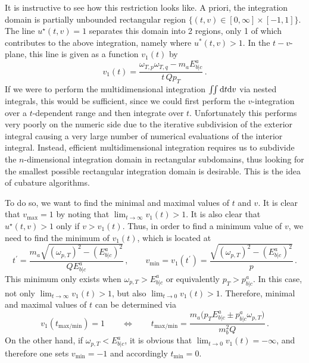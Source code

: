 It is instructive to see how this restriction looks like. A priori, the integration domain is partially unbounded rectangular region ${\{(t,v)\in[0,\infty]\times[-1,1]\}}$. The line ${u^\star(t,v)=1}$ separates this domain into 2 regions, only 1 of which contributes to the above integration, namely where ${u^*(t,v)>1}$. In the $t-v$-plane, this line is given as a function ${v_1(t)}$ by
\begin{equation}
    v_1(t)=\frac{\omega_{T,p}\omega_{T,q}-m_aE^a_{b\vert c}}{t\,Qp_T}\,.
    \label{eq:DecayCalc_v1t}
\end{equation}
If we were to perform the multidimensional integration ${\iint\text{d} t\text{d} v}$ via nested integrals, this would be sufficient, since we could first perform the $v$-integration over a $t$-dependent range and then integrate over $t$. Unfortunately this performs very poorly on the numeric side due to the iterative subdivision of the exterior integral causing a very large number of numerical evaluations of the interior integral. Instead, efficient multidimensional integration requires us to subdivide the $n$-dimensional integration domain in rectangular subdomains, thus looking for the smallest possible rectangular integration domain is desirable. This is the idea of cubature algorithms.

To do so, we want to find the minimal and maximal values of $t$ and $v$. It is clear that ${v_{\text{max}}=1}$ by noting that ${\lim_{t\to\infty}v_1(t)>1}$. It is also clear that ${u^\star(t,v)>1}$ only if ${v>v_1(t)}$. Thus, in order to find a minimum value of $v$, we need to find the minimum of $v_1(t)$, which is located at
\begin{equation}
    t^\prime=\frac{m_a\sqrt{(\omega_{p,T})^2-(E^a_{b\vert c})^2}}{QE^a_{b\vert c}}\,,\qquad v_{\text{min}}=v_1(t^\prime)=\frac{\sqrt{(\omega_{p,T})^2-(E^a_{b\vert c})^2}}{p}\,.
    \label{eq:Cubature_vmin}
\end{equation}
This minimum only exists when ${\omega_{p,T}>E^a_{b\vert c}}$ or equivalently ${p_T>p^a_{b\vert c}}$. In this case, not only ${\lim_{t\to\infty}v_1(t)>1}$, but also ${\lim_{t\to0}v_1(t)>1}$. Therefore, minimal and maximal values of $t$ can be determined via
\begin{equation}
    v_1(t_{\text{max/min}})=1\qquad\iff\qquad t_{\text{max/min}}=\frac{m_a\big(p_TE^a_{b\vert c}\pm p^a_{b\vert c}\omega_{p,T}\big)}{m_b^2Q}\,.
    \label{eq:Cubature_tminmax}
\end{equation}
On the other hand, if ${\omega_{p,T}<E^a_{b\vert c}}$, it is obvious that ${\lim_{t\to0}v_1(t)=-\infty}$, and therefore one sets ${v_{\text{min}}=-1}$ and accordingly ${t_{\text{min}}=0}$.

